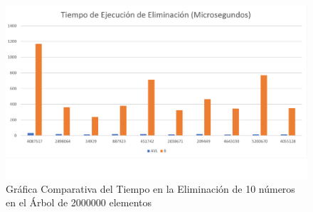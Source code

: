 \documentclass[acmsmall]{acmart}
\begin{document}
\begin{figure}[ht]
  \centering
  \caption{Gráfica Comparativa del Tiempo en la Eliminación de 10 números en el Árbol de 2000000 elementos}

  \includegraphics[angle=0,scale=0.5]{2000000.3 elem.png}
  
\end{figure}

\clearpage

\end{document}
